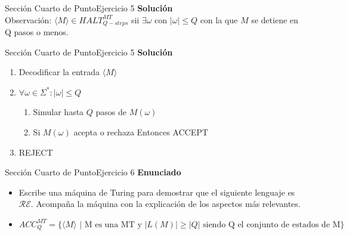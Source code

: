 \documentclass[10pt, envcountsect, presentation, aspectratio=169]{beamer}
\newcommand{\lr}{\ensuremath{\mathcal {RE}}}
\begin{document}

\begin{frame}{Sección Cuarto de Punto}{Ejercicio 5}
    \textbf{Solución}\\
    Observación: $\langle M \rangle \in HALT_{Q-steps}^{MT}$ sii $\exists \omega \text{ con } | \omega | \leq Q$ con la que $M$ se detiene en Q pasos o menos.\\
\end{frame}


\begin{frame}{Sección Cuarto de Punto}{Ejercicio 5}
    \textbf{Solución}\\
    \begin{enumerate}
        \item Decodificar la entrada $\langle M \rangle$
        \item $\forall \omega \in \Sigma^* : |\omega| \leq Q$
        \begin{enumerate}
            \item Simular hasta $Q$ pasos de $M(\omega)$
            \item Si $M(\omega)$ acepta o rechaza Entonces ACCEPT
        \end{enumerate}
        \item REJECT
    \end{enumerate}
\end{frame}


\begin{frame}{Sección Cuarto de Punto}{Ejercicio 6}
\textbf{Enunciado}
	\begin{itemize}
        \item Escribe una máquina de Turing para demostrar que el siguiente lenguaje es $\lr$. Acompaña la máquina con la explicación de los aspectos más relevantes. 
        \item[] $$ACC_{Q}^{MT}=\{\langle M \rangle \mbox{ | M es una MT y } |L(M)| \geq |Q| \mbox{ siendo Q el conjunto de estados de M}\}$$
    \end{itemize}
\end{frame}

\end{document}
